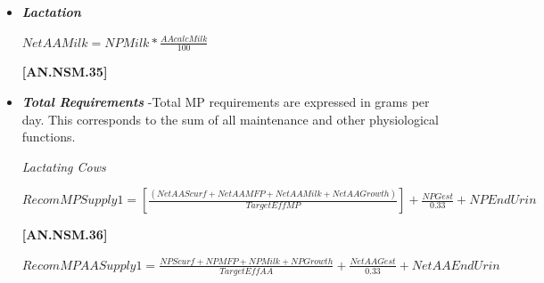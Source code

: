 \documentclass{article}
\begin{document}
\begin{refsection}
\begin{itemize}
    \begin{center}
    \(NPGest = GainGrUter * 125\)
    \end{center}

\vspace{0.5cm}
            {\raggedleft \textbf{[AN.NSM.33]}\par}
            \vspace{0.5cm}  

    \begin{center}
    \(NetAAGest = NPGest * \frac{AACorrWEBW}{100}\)
    \end{center}

\vspace{0.5cm}
            {\raggedleft \textbf{[AN.NSM.34]}\par}
            \vspace{0.5cm}  
            
    \item \textbf{\textit{Lactation}}
\vspace{0.2cm}

    \begin{center}
    \(NetAAMilk = NPMilk * \frac{AAcalcMilk}{100}\)
    \end{center}

\vspace{0.5cm}
            {\raggedleft \textbf{[AN.NSM.35]}\par}
            \vspace{0.5cm}  

        \item \textbf{\textit{Total Requirements}} -Total MP requirements are expressed in grams per day. This corresponds to the sum of all maintenance and other physiological functions.
\vspace{0.2cm}

\textit{\small Lactating Cows}
\vspace{0.2cm}

    \begin{center}
    \(RecomMPSupply1 =  [\frac{(NetAAScurf + NetAAMFP + NetAAMilk + NetAAGrowth)}{TargetEffMP}] + \frac{NPGest}{0.33} +NPEndUrin\)
    \end{center}

\vspace{0.5cm}
            {\raggedleft \textbf{[AN.NSM.36]}\par}
            \vspace{0.5cm}

    \begin{center}
    \(RecomMPAASupply1 =  \frac{NPScurf + NPMFP + NPMilk + NPGrowth}{TargetEffAA} + \frac{NetAAGest}{0.33} + NetAAEndUrin\)
    \end{center}


\end{itemize}
\end{refsection}
\end{document}
